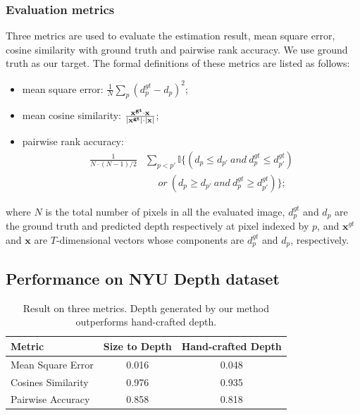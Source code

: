 \documentclass[10pt,twocolumn,letterpaper]{article}
\begin{document}
\subsubsection{Evaluation metrics}
\text{\ \ \ } Three metrics are used to evaluate the estimation result, \ie mean square error, cosine similarity with ground truth and pairwise rank accuracy. We use ground truth as our target. The formal definitions of these metrics are listed as follows:

\begin{itemize}
\item mean square error:
$\frac{1}{N} \sum_p{(d_p^{gt} - d_p)^2} $;
\item mean cosine similarity:
$ \frac{\bf{x}^{gt} \cdot \bf{x}}{|\bf{x}^{gt}| \cdot |\bf{x}|} $;
\item pairwise rank accuracy:\\
\begin{align*}
\frac{1}{N \cdot (N-1) / 2} &\sum_{p < p'}\mathbb{I} \{(d_p \leqslant d_{p'} \ and \ d_p^{gt} \leqslant d_{p'}^{gt}) \\
 &\ \ \ \ \ \  or\  (d_p \geqslant d_{p'} \ and \ d_p^{gt} \geqslant d_{p'}^{gt}) \};
\end{align*} 
\end{itemize}
where $N$ is the total number of pixels in all the evaluated image, $d_p^{gt}$ and $d_p$ are the ground truth and predicted depth respectively at pixel indexed by $p$, and $\mathbf{x}^{gt}$ and $\mathbf{x}$ are $T$-dimensional vectors whose components are $d_p^{gt}$ and $d_p$, respectively.

\subsection{Performance on NYU Depth dataset}
\begin{table}
\begin{center}
\begin{tabular}{|l|c|c|}
\hline
Metric             & Size to Depth & Hand-crafted Depth\\ 
\hline
Mean Square Error  & 0.016     & 0.048 \\
Cosines Similarity     & 0.976    & 0.935 \\
Pairwise Accuracy  & 0.858     & 0.818 \\
\hline
\end{tabular}
\end{center}
\caption{Result on three metrics. Depth generated by our method outperforms hand-crafted depth.}
\end{table}
\end{document}

